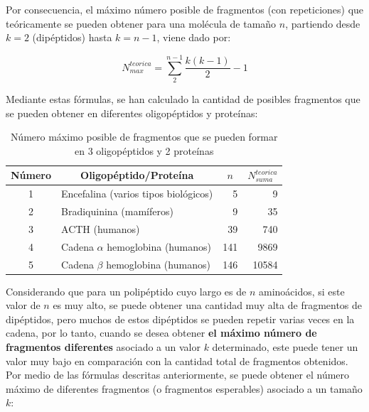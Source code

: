 Por consecuencia, el máximo número posible de fragmentos (con repeticiones) que teóricamente se pueden obtener para una molécula de tamaño $n$, partiendo desde $k=2$ (dipéptidos) hasta $k=n-1$, viene dado por:

\begin{equation}
N_{max}^{teorica}=\sum_{2}^{n-1} \frac{k(k-1)}{2}-1
\end{equation}

Mediante estas fórmulas, se han calculado la cantidad de posibles fragmentos que se pueden obtener en diferentes oligopéptidos y proteínas:

\begin{table}[H]
\centering
\label{my-label3}
\begin{tabular}{|c|l|r|r|}
\hline
Número & \multicolumn{1}{c|}{Oligopéptido/Proteína} & \multicolumn{1}{c|}{$n$} & \multicolumn{1}{c|}{$N_{suma}^{teorica}$} \\ \hline
1      & Encefalina (varios tipos biológicos)       & 5                        & 9                     \\
2      & Bradiquinina (mamíferos)                   & 9                        & 35                    \\
3      & ACTH (humanos)                             & 39                       & 740                   \\
4      & Cadena $\alpha$ hemoglobina (humanos)          & 141                      & 9869                  \\
5      & Cadena $\beta$ hemoglobina (humanos)          & 146                      & 10584                 \\ \hline
\end{tabular}
\caption{Número máximo posible de fragmentos que se pueden formar en 3 oligopéptidos y 2 proteínas}
\end{table}

Considerando que para un polipéptido cuyo largo es de $n$ aminoácidos, si este valor de $n$ es muy alto, se puede obtener una cantidad muy alta de fragmentos de dipéptidos, pero muchos de estos dipéptidos se pueden repetir varias veces en la cadena, por lo tanto, cuando se desea obtener {\bf{el máximo número de fragmentos diferentes}} asociado a un valor $k$ determinado, este puede tener un valor muy bajo en comparación con la cantidad total de fragmentos obtenidos. Por medio de las fórmulas descritas anteriormente, se puede obtener el número máximo de diferentes fragmentos (o fragmentos esperables) asociado a un tamaño $k$:

